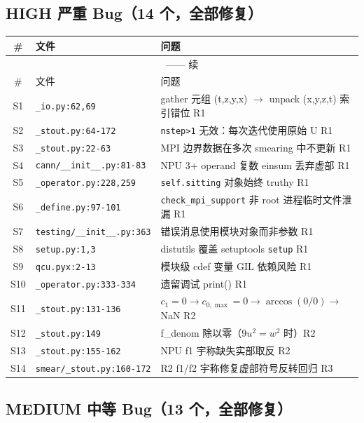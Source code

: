 \documentclass[11pt,a4paper]{article}
\newcommand{\high}{\textcolor{severityhigh}{\textbf{HIGH}}}
\newcommand{\med}{\textcolor{severitymed}{\textbf{MEDIUM}}}
\begin{document}
\subsection{\high{} 严重 Bug（14 个，全部修复）}

\begin{longtable}{cll}
\toprule
\# & 文件 & 问题 \\
\midrule
\endfirsthead
\multicolumn{3}{c}{\tablename{} \thetable{} —— 续} \\
\midrule
\# & 文件 & 问题 \\
\midrule
\endhead
\bottomrule
\endfoot
S1 & \texttt{\_io.py:62,69} & gather 元组 (t,z,y,x) $\rightarrow$ unpack (x,y,z,t) 索引错位 \hfill R1 \\
S2 & \texttt{\_stout.py:64-172} & \texttt{nstep>1} 无效：每次迭代使用原始 U \hfill R1 \\
S3 & \texttt{\_stout.py:22-63} & MPI 边界数据在多次 smearing 中不更新 \hfill R1 \\
S4 & \texttt{cann/\_\_init\_\_.py:81-83} & NPU 3+ operand 复数 einsum 丢弃虚部 \hfill R1 \\
S5 & \texttt{\_operator.py:228,259} & \texttt{self.sitting} 对象始终 truthy \hfill R1 \\
S6 & \texttt{\_define.py:97-101} & \texttt{check\_mpi\_support} 非 root 进程临时文件泄漏 \hfill R1 \\
S7 & \texttt{testing/\_\_init\_\_.py:363} & 错误消息使用模块对象而非参数 \hfill R1 \\
S8 & \texttt{setup.py:1,3} & distutils 覆盖 setuptools \texttt{setup} \hfill R1 \\
S9 & \texttt{qcu.pyx:2-13} & 模块级 cdef 变量 GIL 依赖风险 \hfill R1 \\
S10 & \texttt{\_operator.py:333-334} & 遗留调试 print() \hfill R1 \\
S11 & \texttt{\_stout.py:131-136} & $c_1=0 \rightarrow c_{0,\max}=0 \rightarrow \arccos(0/0) \rightarrow$ NaN \hfill R2 \\
S12 & \texttt{\_stout.py:149} & f\_denom 除以零（$9u^2=w^2$ 时）\hfill R2 \\
S13 & \texttt{\_stout.py:155-162} & NPU f1 宇称缺失实部取反 \hfill R2 \\
S14 & \texttt{smear/\_stout.py:160-172} & R2 f1/f2 宇称修复虚部符号反转回归 \hfill R3 \\
\end{longtable}

\subsection{\med{} 中等 Bug（13 个，全部修复）}
\end{document}
